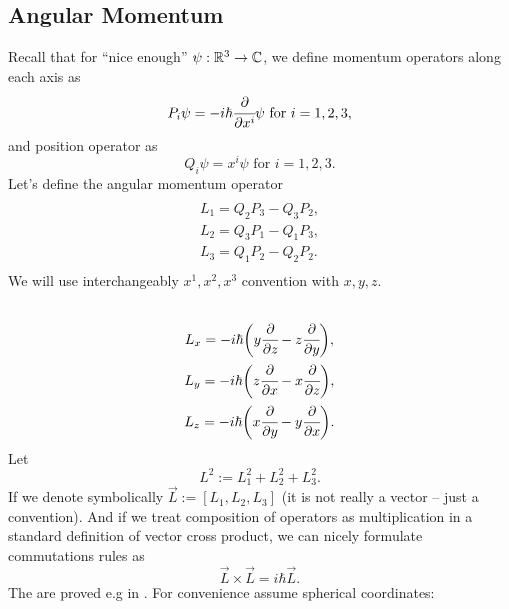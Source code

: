 \documentclass[main.tex]{subfiles}
\begin{document}
\subsection{Angular Momentum}
Recall that for ``nice enough'' $\psi:\mathbb{R}^3\to\mathbb{C}$, we define momentum operators along each axis as
\begin{equation}
P_i \psi = -i\hbar \cfrac{\partial}{\partial x^i}\psi \text{ for } i=1,2,3,
\end{equation}
and position operator as
\begin{equation}
Q_i\psi = x^i\psi \text{ for } i=1,2,3.
\end{equation}
Let's define the angular momentum operator
\begin{multline}\\
L_1 = Q_2P_3 - Q_3P_2, \\
L_2 = Q_3P_1 - Q_1P_3, \\
L_3 = Q_1P_2 - Q_2P_2. \\
\end{multline}
We will use interchangeably $x^1, x^2, x^3$ convention with $x,y,z$.
\begin{multline}
\\
L_x = -i\hbar\bigg( y\cfrac{\partial}{\partial z} - z\cfrac{\partial}{\partial y}\bigg),\\
L_y = -i\hbar\bigg( z\cfrac{\partial}{\partial x} - x\cfrac{\partial}{\partial z}\bigg),\\
L_z = -i\hbar\bigg( x\cfrac{\partial}{\partial y} - y\cfrac{\partial}{\partial x}\bigg).\\
\end{multline}
Let 
\begin{equation}
L^2 := L_1^2 + L_2^2 + L_3^2.
\end{equation}
If we denote symbolically $\vec{L} := [L_1, L_2, L_3]$ (it is not really a vector -- just a convention). And if we treat composition of operators as multiplication in a standard definition of vector cross product, we can nicely formulate commutations rules as
\begin{equation}
\vec{L}\times \vec{L} = i\hbar \vec{L}.
\end{equation}
The are proved e.g in \cite[see][4.8 Angular-Momentum Operators]{walter-greiner2001}.
For convenience assume spherical coordinates:
\end{document}
